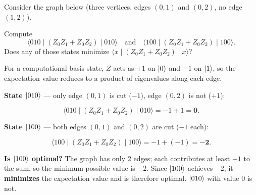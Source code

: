 \documentclass{ceri/sty/rapport}
\newcounter{exercice}[section]
\begin{document}
\begin{exercice}[p.~93]
Consider the graph below (three vertices, edges $(0,1)$ and $(0,2)$, no edge $(1,2)$).

\medskip
\begin{center}
\end{center}

\medskip
Compute
\[
  \langle 010 \mid (Z_0 Z_1 + Z_0 Z_2) \mid 010 \rangle
  \quad \text{and} \quad
  \langle 100 \mid (Z_0 Z_1 + Z_0 Z_2) \mid 100 \rangle.
\]
Does any of those states minimize $\langle x \mid (Z_0 Z_1 + Z_0 Z_2) \mid x \rangle$?
\end{exercice}

\begin{solution}
For a computational basis state, $Z$ acts as $+1$ on $\ket{0}$ and $-1$ on $\ket{1}$,
so the expectation value reduces to a product of eigenvalues along each edge.

\medskip
\textbf{State $\ket{010}$} — only edge $(0,1)$ is cut ($-1$), edge $(0,2)$ is not ($+1$):

\begin{center}
\end{center}
\[
  \langle 010 \mid (Z_0 Z_1 + Z_0 Z_2) \mid 010 \rangle = -1 + 1 = \mathbf{0}.
\]

\medskip
\textbf{State $\ket{100}$} — both edges $(0,1)$ and $(0,2)$ are cut ($-1$ each):

\begin{center}
\end{center}
\[
  \langle 100 \mid (Z_0 Z_1 + Z_0 Z_2) \mid 100 \rangle = -1 + (-1) = \mathbf{-2}.
\]

\textbf{Is $\ket{100}$ optimal?}
The graph has only 2 edges; each contributes at least $-1$ to the sum,
so the minimum possible value is $-2$.
Since $\ket{100}$ achieves $-2$, it \textbf{minimizes} the expectation value
and is therefore optimal. $\ket{010}$ with value $0$ is not.
\end{solution}
\end{document}

